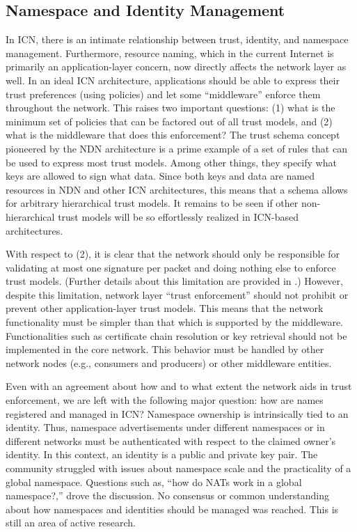 \subsection{Namespace and Identity Management}
In ICN, there is an intimate relationship between trust, identity, and namespace management.
Furthermore, resource naming, which in the current Internet is primarily an application-layer
concern, now directly affects the network layer as well.
In an ideal ICN architecture, applications should be able to express their trust preferences
(using policies) and let some ``middleware'' enforce them throughout the network. This raises
two important questions: (1) what is the minimum set of policies that can be factored out of
all trust models, and (2) what is the middleware that does this enforcement? The trust schema concept
pioneered by the NDN architecture \cite{schemas} is a prime example of a set of rules that can be
used to express most trust models. Among other things, they specify what keys are allowed to
sign what data. Since both keys and data are named resources in NDN and other ICN architectures,
this means that a schema allows for arbitrary hierarchical trust models. It remains to be seen
if other non-hierarchical trust models will be so effortlessly realized in ICN-based architectures.

With respect to (2), it is clear that the network should only be responsible for
validating at most one signature per packet and doing nothing else to enforce
trust models. (Further details about this limitation are provided in \cite{trust}.)
However, despite this limitation, network layer ``trust enforcement'' should not prohibit or prevent other
application-layer trust models. This means that the network functionality must be simpler than
that which is supported by the middleware. Functionalities such as certificate chain
resolution or key retrieval should not be implemented in the core network.
This behavior must be handled by other network nodes (e.g., consumers and producers)
or other middleware entities.

Even with an agreement about how and to what extent the network aids in trust
enforcement, we are left with the following major question: how are names registered and managed in ICN?
Namespace ownership is intrinsically tied to an identity. Thus, namespace advertisements under
different namespaces or in different networks must be authenticated with respect to the
claimed owner's identity. In this context, an identity is a public and private key pair.
The community struggled with issues about namespace scale and the practicality of a global
namespace. Questions such as, ``how do NATs work in a global namespace?,'' drove the
discussion. No consensus or common understanding about how namespaces and identities
should be managed was reached. This is still an area of active research.

